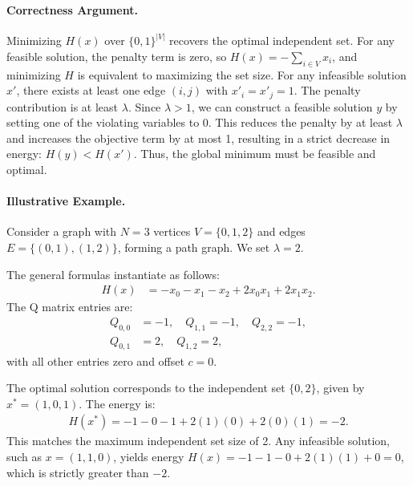 \documentclass[12pt]{article}
\begin{document}
\paragraph{Correctness Argument.}
Minimizing $H(x)$ over $\{0,1\}^{|V|}$ recovers the optimal independent set. For any feasible solution, the penalty term is zero, so $H(x) = -\sum_{i \in V} x_i$, and minimizing $H$ is equivalent to maximizing the set size. For any infeasible solution $x'$, there exists at least one edge $(i,j)$ with $x'_i = x'_j = 1$. The penalty contribution is at least $\lambda$. Since $\lambda > 1$, we can construct a feasible solution $y$ by setting one of the violating variables to 0. This reduces the penalty by at least $\lambda$ and increases the objective term by at most 1, resulting in a strict decrease in energy: $H(y) < H(x')$. Thus, the global minimum must be feasible and optimal.

\paragraph{Illustrative Example.}
Consider a graph with $N=3$ vertices $V=\{0,1,2\}$ and edges $E=\{(0,1), (1,2)\}$, forming a path graph. We set $\lambda = 2$.

The general formulas instantiate as follows:
\begin{align}
H(x) &= -x_0 - x_1 - x_2 + 2 x_0 x_1 + 2 x_1 x_2.
\end{align}
The Q matrix entries are:
\begin{align}
Q_{0,0} &= -1, \quad Q_{1,1} = -1, \quad Q_{2,2} = -1, \\
Q_{0,1} &= 2, \quad Q_{1,2} = 2,
\end{align}
with all other entries zero and offset $c=0$.

The optimal solution corresponds to the independent set $\{0,2\}$, given by $x^* = (1,0,1)$. The energy is:
\begin{align}
H(x^*) = -1 - 0 - 1 + 2(1)(0) + 2(0)(1) = -2.
\end{align}
This matches the maximum independent set size of 2. Any infeasible solution, such as $x=(1,1,0)$, yields energy $H(x) = -1-1-0 + 2(1)(1) + 0 = 0$, which is strictly greater than $-2$.
\end{document}
